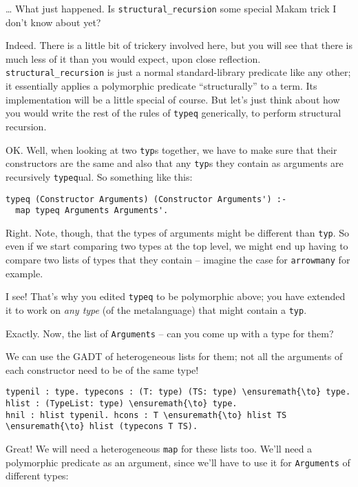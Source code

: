 \heroSTUDENT{} \ldots{} What just happened. Is \texttt{structural\_recursion}
some special Makam trick I don't know about yet?

\heroADVISOR{} Indeed. There is a little bit of trickery involved here, but
you will see that there is much less of it than you would expect, upon
close reflection. \texttt{structural\_recursion} is just a normal
standard-library predicate like any other; it essentially applies a
polymorphic predicate ``structurally'' to a term. Its implementation
will be a little special of course. But let's just think about how you
would write the rest of the rules of \texttt{typeq} generically, to
perform structural recursion.

\heroSTUDENT{} OK. Well, when looking at two \texttt{typ}s together, we have
to make sure that their constructors are the same and also that any
\texttt{typ}s they contain as arguments are recursively
\texttt{typeq}ual. So something like this:

\begin{verbatim}
typeq (Constructor Arguments) (Constructor Arguments') :-
  map typeq Arguments Arguments'.
\end{verbatim}

\heroADVISOR{} Right. Note, though, that the types of arguments might be
different than \texttt{typ}. So even if we start comparing two types at
the top level, we might end up having to compare two lists of types that
they contain -- imagine the case for \texttt{arrowmany} for example.

\heroSTUDENT{} I see! That's why you edited \texttt{typeq} to be polymorphic
above; you have extended it to work on \emph{any type} (of the
metalanguage) that might contain a \texttt{typ}.

\heroADVISOR{} Exactly. Now, the list of \texttt{Arguments} -- can you come up
with a type for them?

\heroSTUDENT{} We can use the GADT of heterogeneous lists for them; not all
the arguments of each constructor need to be of the same type!

\begin{verbatim}
typenil : type. typecons : (T: type) (TS: type) \ensuremath{\to} type.
hlist : (TypeList: type) \ensuremath{\to} type.
hnil : hlist typenil. hcons : T \ensuremath{\to} hlist TS \ensuremath{\to} hlist (typecons T TS).
\end{verbatim}

\heroADVISOR{} Great! We will need a heterogeneous \texttt{map} for these
lists too. We'll need a polymorphic predicate as an argument, since
we'll have to use it for \texttt{Arguments} of different types:

